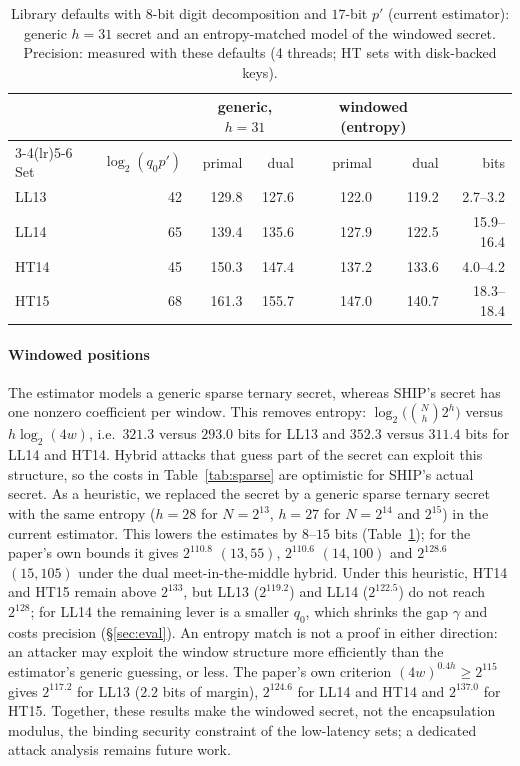 \documentclass[sigconf,nonacm]{acmart}
\newcommand{\lgqp}{\log_2(q_0 p')}
\begin{document}
\begin{table}[t]
\caption{Library defaults with $8$-bit digit decomposition and $17$-bit $p'$ (current estimator): generic $h=31$ secret and an entropy-matched model of the windowed secret. Precision: measured with these defaults (4 threads; HT sets with disk-backed keys).}
\label{tab:defaults}
\small
\setlength{\tabcolsep}{3pt}
\begin{tabular}{lrrrrrr}
\toprule
 & & \multicolumn{2}{c}{generic, $h=31$} & \multicolumn{2}{c}{windowed (entropy)} & \\
\cmidrule(lr){3-4}\cmidrule(lr){5-6}
Set & $\lgqp$ & primal & dual & primal & dual & bits \\
\midrule
LL13 & 42 & 129.8 & 127.6 & 122.0 & 119.2 & 2.7--3.2 \\
LL14 & 65 & 139.4 & 135.6 & 127.9 & 122.5 & 15.9--16.4 \\
HT14 & 45 & 150.3 & 147.4 & 137.2 & 133.6 & 4.0--4.2 \\
HT15 & 68 & 161.3 & 155.7 & 147.0 & 140.7 & 18.3--18.4 \\
\bottomrule
\end{tabular}
\end{table}

\paragraph{Windowed positions}
The estimator models a generic sparse ternary secret, whereas SHIP's secret has one nonzero coefficient per window.
This removes entropy: $\log_2\big(\binom{N}{h}2^h\big)$ versus $h\log_2(4w)$, i.e.\ $321.3$ versus $293.0$ bits for LL13 and $352.3$ versus $311.4$ bits for LL14 and HT14.
Hybrid attacks that guess part of the secret can exploit this structure, so the costs in Table~\ref{tab:sparse} are optimistic for SHIP's actual secret.
As a heuristic, we replaced the secret by a generic sparse ternary secret with the same entropy ($h=28$ for $N=2^{13}$, $h=27$ for $N=2^{14}$ and $2^{15}$) in the current estimator.
This lowers the estimates by $8$--$15$ bits (Table~\ref{tab:defaults}); for the paper's own bounds it gives $2^{110.8}$ $(13,55)$, $2^{110.6}$ $(14,100)$ and $2^{128.6}$ $(15,105)$ under the dual meet-in-the-middle hybrid.
Under this heuristic, HT14 and HT15 remain above $2^{133}$, but LL13 ($2^{119.2}$) and LL14 ($2^{122.5}$) do not reach $2^{128}$; for LL14 the remaining lever is a smaller $q_0$, which shrinks the gap $\gamma$ and costs precision (\S\ref{sec:eval}).
An entropy match is not a proof in either direction: an attacker may exploit the window structure more efficiently than the estimator's generic guessing, or less.
The paper's own criterion $(4w)^{0.4h}\ge 2^{115}$~\cite{May21,CHKS25} gives $2^{117.2}$ for LL13 ($2.2$ bits of margin), $2^{124.6}$ for LL14 and HT14 and $2^{137.0}$ for HT15.
Together, these results make the windowed secret, not the encapsulation modulus, the binding security constraint of the low-latency sets; a dedicated attack analysis remains future work.
\end{document}
